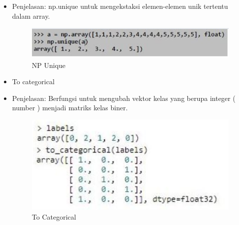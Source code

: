 \begin{enumerate}
\begin{itemize}
\item Penjelasan: np.unique untuk mengekstaksi elemen-elemen unik tertentu dalam array.
\begin{figure}[!hbtp]
\centering
\includegraphics[scale=0.7]{figures/andi/67.png}
\caption{NP Unique}
\label{Contoh 7}
\end{figure}


\end{itemize}
\begin{itemize}
\item  To categorical
\item Penjelasan: Berfungsi untuk mengubah vektor kelas yang berupa integer ( number ) menjadi matriks kelas biner.	
\begin{figure}[!hbtp]
\centering
\includegraphics[scale=0.7]{figures/andi/67_1.PNG}
\caption{To Categorical}
\label{Contoh 7_1}
\end{figure}
\end{itemize}



\end{enumerate}
